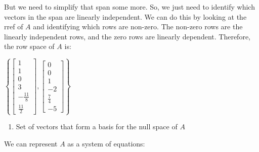 \documentclass[
  letterpaper,
  DIV=11,
  numbers=noendperiod]{scrartcl}
\providecommand{\tightlist}{%
  \setlength{\itemsep}{0pt}\setlength{\parskip}{0pt}}\usepackage{longtable,booktabs,array}
\begin{document}
But we need to simplify that span some more. So, we just need to
identify which vectors in the span are linearly independent. We can do
this by looking at the rref of \(A\) and identifying which rows are
non-zero. The non-zero rows are the linearly independent rows, and the
zero rows are linearly dependent. Therefore, the row space of \(A\) is:

\(\left\{\begin{bmatrix}1 \\ 1 \\ 0 \\ 3 \\ -\frac{11}{8} \\ \frac{11}{2}\end{bmatrix},\begin{bmatrix}0 \\ 0 \\ 1 \\ -2 \\ \frac{7}{4} \\ -5\end{bmatrix}\right\}\)

\begin{enumerate}
\def\labelenumi{\alph{enumi}.}
\setcounter{enumi}{2}
\tightlist
\item
  Set of vectors that form a basis for the null space of \(A\)
\end{enumerate}

We can represent \(A\) as a system of equations:

\end{document}
